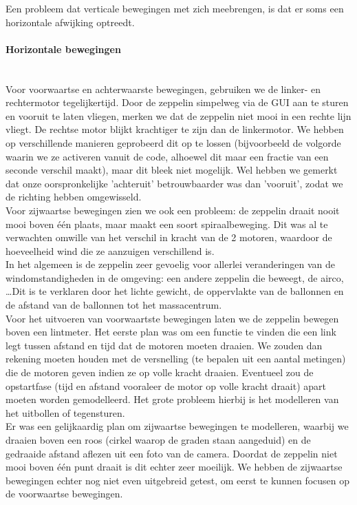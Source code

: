 \documentclass[eind]{penoverslag}
\begin{document}
Een probleem dat verticale bewegingen met zich meebrengen, is dat er soms een horizontale afwijking optreedt.

\paragraph{Horizontale bewegingen} ~\\
Voor voorwaartse en achterwaarste bewegingen, gebruiken we de linker- en rechtermotor tegelijkertijd. Door de zeppelin simpelweg via de GUI aan te sturen en vooruit te laten vliegen, merken we dat de zeppelin niet mooi in een rechte lijn vliegt. De rechtse motor blijkt krachtiger te zijn dan de linkermotor. We hebben op verschillende manieren geprobeerd dit op te lossen (bijvoorbeeld de volgorde waarin we ze activeren vanuit de code, alhoewel dit maar een fractie van een seconde verschil maakt), maar dit bleek niet mogelijk. Wel hebben we gemerkt dat onze oorspronkelijke 'achteruit' betrouwbaarder was dan 'vooruit', zodat we de richting hebben omgewisseld. \\

Voor zijwaartse bewegingen zien we ook een probleem: de zeppelin draait nooit mooi boven \'e\'en plaats, maar maakt een soort spiraalbeweging. Dit was al te verwachten omwille van het verschil in kracht van de 2 motoren, waardoor de hoeveelheid wind die ze aanzuigen verschillend is. \\

In het algemeen is de zeppelin zeer gevoelig voor allerlei veranderingen van de windomstandigheden in de omgeving: een andere zeppelin die beweegt, de airco, \ldots Dit is te verklaren door het lichte gewicht, de oppervlakte van de ballonnen en de afstand van de ballonnen tot het massacentrum. \\

Voor het uitvoeren van voorwaartste bewegingen laten we de zeppelin bewegen boven een lintmeter. Het eerste plan was om een functie te vinden die een link legt tussen afstand en tijd dat de motoren moeten draaien. We zouden dan rekening moeten houden met de versnelling (te bepalen uit een aantal metingen) die de motoren geven indien ze op volle kracht draaien. Eventueel zou de opstartfase (tijd en afstand vooraleer de motor op volle kracht draait) apart moeten worden gemodelleerd. Het grote probleem hierbij is het modelleren van het uitbollen of tegensturen. \\

Er was een gelijkaardig plan om zijwaartse bewegingen te modelleren, waarbij we draaien boven een roos (cirkel waarop de graden staan aangeduid) en de gedraaide afstand aflezen uit een foto van de camera. Doordat de zeppelin niet mooi boven \'e\'en punt draait is dit echter zeer moeilijk. We hebben de zijwaartse bewegingen echter nog niet even uitgebreid getest, om eerst te kunnen focusen op de voorwaartse bewegingen.
\end{document}
